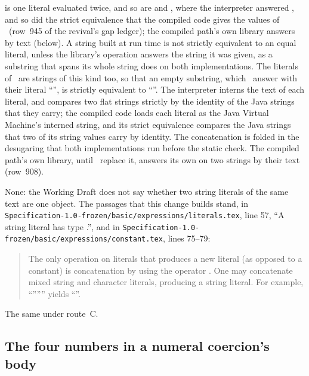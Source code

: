 \begin{description}
is one literal evaluated twice, and so are
and ,
where the interpreter answered , and so did the strict equivalence
that the compiled code gives the values of \library\ (row~945 of the revival's
gap ledger); the compiled path's own library answers by text (below).
A string built at run time is not strictly equivalent to an equal literal,
unless the library's operation answers the string it was given, as a substring
that spans its whole string does on both implementations.
The literals of \library\ are strings of this kind too, so that an empty
substring, which \library\ answer with their literal \hbox{\rm``''}, is strictly
equivalent to \hbox{\rm``''}.
The interpreter interns the text of each literal, and compares two flat strings
strictly by the identity of the Java strings that they carry; the compiled code
loads each literal as the Java Virtual Machine's interned string, and its strict
equivalence compares the Java strings that two of its string values carry by
identity.
The concatenation is folded in the desugaring that both implementations run
before the static check.
The compiled path's own library, until \library\ replace it, answers its own
\EXP{\sequiv} on two strings by their text (row~908).
\item[Original text] None: the Working Draft does not say whether two string
literals of the same text are one object.
The passages that this change builds stand, in
\nolinkurl{Specification-1.0-frozen/basic/expressions/literals.tex}, line 57,
``A string literal has type .'', and in
\nolinkurl{Specification-1.0-frozen/basic/expressions/constant.tex}, lines
75--79:
\begin{quote}
The only operation on literals that produces a new literal (as opposed
to a constant) is concatenation by using the operator \EXP{\|}.
One may concatenate mixed string and
character literals, producing a string literal.
For example, ``''\EXP{\|}'''' yields ``''.
\end{quote}
\item[Route C] The same under route~C.
\end{description}

\subsection{The four numbers in a numeral coercion's body}

